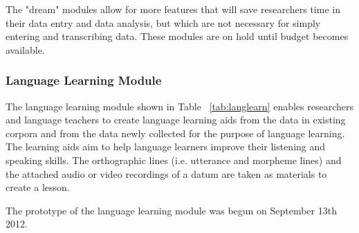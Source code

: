 \documentclass[12 pt]{article}
\begin{document}
The "dream" modules allow for more features that will save researchers time in their data entry and data analysis, but which are not necessary for simply entering and transcribing data. These modules are on hold until budget becomes available.


\subsubsection{Language Learning Module}
The language learning module shown in Table ~\ref{tab:langlearn} enables researchers and language teachers to create language learning aids from the data in existing corpora and from the data newly collected for the purpose of language learning. The learning aids aim to help language learners improve their listening and speaking skills. The orthographic lines (i.e. utterance and morpheme lines) and the attached audio or video recordings of a datum are taken as materials to create a lesson. 


The prototype of the language learning module was begun on September 13th 2012.
\end{document}
